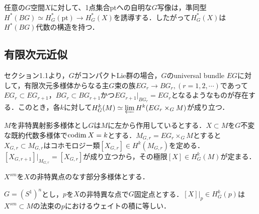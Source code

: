 任意の$G$空間$X$に対して、1点集合$\text{pt}$への自明な$G$写像は，準同型$H^*(BG)\simeq H^*_G(\text{pt})\rightarrow H^*_G(X)$を誘導する．したがって$H^*_G(X)$は$H^*(BG)$代数の構造を持つ．



\subsection{有限次元近似}

セクション1.1より，$G$がコンパクトLie群の場合，$G$のuniversal bundle $EG$に対して，有限次元多様体からなる主$G$束の族$EG_r\rightarrow BG_r, (r=1,2,\cdots)$であって$EG_r\subset EG_{r+1}$，$BG_r\subset BG_{r+1}$かつ$EG_{r+1}|_{BG_r} = EG_r$となるようなものが存在する．このとき，各$k$に対して$H^k_G(M)\simeq \varprojlim H^k(EG_r\times_GM)$が成り立つ．


$M$を非特異射影多様体とし$G$は$M$に左から作用しているとする．$X\subset M$を$G$不変な既約代数多様体で$\text{codim}\: X =k$とする．$M_{G,r}=EG_r\times_GM$とすると$X_{G,r}\subset M_{G,r}$はコホモロジー類$[X_{G,r}]\in H^k(M_{G,r})$を定める\cite{fulton young tableaux}．$[X_{G,r+1}]|_{M_{G,r}} = [X_{G,r}]$が成り立つから，その極限$[X]\in H^k_G(M)$が定まる．

$X^{sm}$を$X$の非特異点のなす部分多様体とする．

\begin{prop}\label{restriction to fixed point}
  $G=(S^1)^n$とし，$p$を$X$の非特異な点で$G$固定点とする．$[X]|_p\in H^k_G(p)$は$X^{sm}\subset M$の法束の$p$におけるウェイトの積に等しい．
\end{prop}

